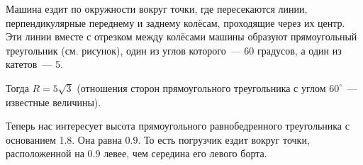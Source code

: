 \begin{itemize}

\itA Машина ездит по окружности вокруг точки, где пересекаются линии, перпендикулярные переднему и заднему колёсам, проходящие через их центр. Эти линии вместе с отрезком между колёсами машины образуют прямоугольный треугольник (см. рисунок), один из углов которого~— 60 градусов, а один из катетов~— \SI{5}{}.

Тогда $R = 5 \sqrt{3}$ (отношения сторон прямоугольного треугольника с углом $60^\circ$~— известные величины).

\begin{center}
\end{center}

\itB Теперь нас интересует высота прямоугольного равнобедренного треугольника с основанием \SI{1.8}{}. Она равна \SI{0.9}{}. То есть погрузчик ездит вокруг точки, расположенной на \SI{0.9}{} левее, чем середина его левого борта.


\end{itemize}
